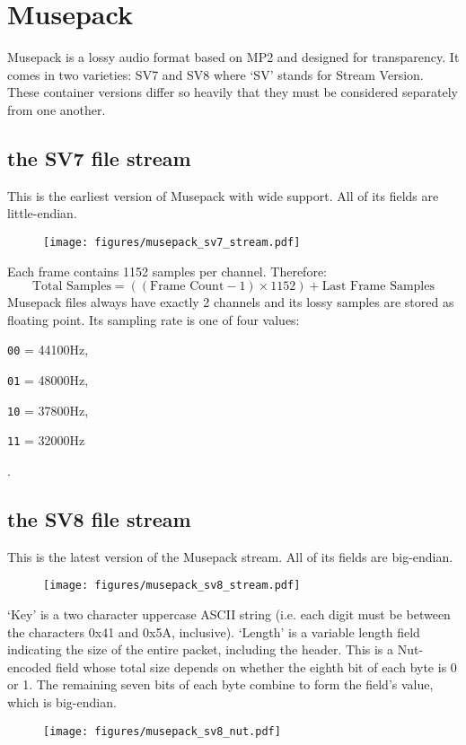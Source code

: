 
\chapter{Musepack}
Musepack is a lossy audio format based on MP2 and designed for
transparency.
It comes in two varieties: SV7 and SV8 where `SV' stands for
Stream Version.
These container versions differ so heavily that they must be
considered separately from one another.
\section{the SV7 file stream}
This is the earliest version of Musepack with wide support.
All of its fields are little-endian.
\begin{figure}[h]
\texttt{[image: figures/musepack\_sv7\_stream.pdf]}
\end{figure}
Each frame contains 1152 samples per channel.
Therefore:
\begin{equation}
\text{Total Samples} = ((\text{Frame Count} - 1) \times 1152) + \text{Last Frame Samples}
\end{equation}
Musepack files always have exactly 2 channels and its lossy samples
are stored as floating point.
Its sampling rate is one of four values:

\begin{inparaenum}
\item[\texttt{00} = ] 44100Hz,
\item[\texttt{01} = ] 48000Hz,
\item[\texttt{10} = ] 37800Hz,
\item[\texttt{11} = ] 32000Hz
\end{inparaenum}
.

\pagebreak

\section{the SV8 file stream}
This is the latest version of the Musepack stream.
All of its fields are big-endian.
\begin{figure}[h]
\texttt{[image: figures/musepack\_sv8\_stream.pdf]}
\end{figure}
\par
\noindent
`Key' is a two character uppercase ASCII string
(i.e. each digit must be between the characters 0x41 and 0x5A, inclusive).
`Length' is a variable length field indicating the size of the entire packet,
including the header.
This is a Nut-encoded field whose total size depends on whether
the eighth bit of each byte is 0 or 1.
The remaining seven bits of each byte combine to form the field's value,
which is big-endian.
\begin{figure}[h]
\texttt{[image: figures/musepack\_sv8\_nut.pdf]}
\end{figure}

